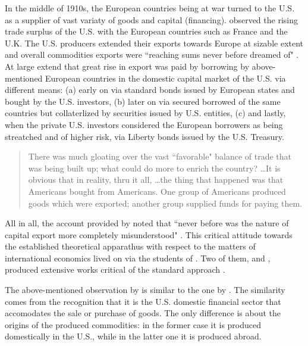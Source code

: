 In the middle of 1910s, the European countries being at war turned to the U.S. as a supplier of vast variaty of goods and capital (financing). \citeauthor{taussig1929} observed the rising trade surplus of the U.S. with the European countries such as France and the U.K. The U.S. producers extended their exports towards Europe at sizable extent and overall commodities exports were ``reaching sums never before dreamed of" \citep[p.~308]{taussig1929}. At large extend that great rise in export was paid by borrowing by above-mentioned European countries in the domestic capital market of the U.S. via different means: (a) early on via standard bonds issued by European states and bought by the U.S. investors, (b) later on via secured borrowed of the same countries but collaterlized by securities issued by U.S. entities, (c) and lastly, when the private U.S. investors considered the European borrowers as being streatched and of higher risk, via Liberty bonds issued by the U.S. Treasury.

\begin{quote}
There was much gloating over the vast ``favorable" balance of trade that was being built up; what could do more to enrich the country? \dots It is obvious that in reality, thru it all, \dots the thing that happened was that Americans bought from Americans. One group of Americans produced goods which were exported; another group supplied funds for paying them. \citep[p.~314]{taussig1929}
\end{quote}

All in all, the account provided by \citeauthor{taussig1929} noted that ``never before was the nature of capital export more completely misunderstood" \citep[p.~316]{taussig1929}. This critical attitude towards the established theoretical apparathus with respect to the matters of international economics lived on via the students of \citeauthor{taussig1929}. Two of them, \citeauthor{angell1925} and \citeauthor{white1933}, produced extensive works critical of the standard approach \citep[see][]{angell1925,white1933}. 

The above-mentioned observation by \citeauthor{taussig1929} is similar to the one by \citeauthor{mosler2010}. The similarity comes from the recognition that it is the U.S. domestic financial sector that accomodates the sale or purchase of goods. The only difference is about the origins of the produced commodities: in the former case it is produced domestically in the U.S., while in the latter one it is produced abroad.

